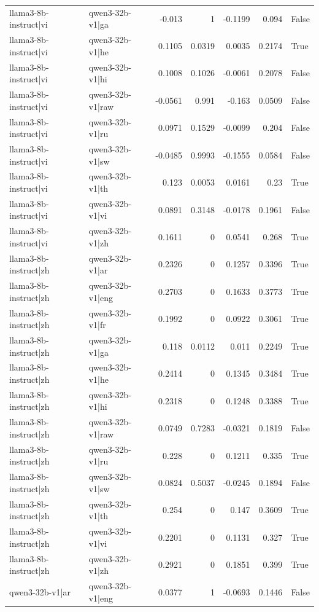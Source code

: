 \begin{table}
\begin{tabular}{l l r r r r l}
llama3-8b-instruct|vi & qwen3-32b-v1|ga & -0.013 & 1 & -0.1199 & 0.094 & False \\
llama3-8b-instruct|vi & qwen3-32b-v1|he & 0.1105 & 0.0319 & 0.0035 & 0.2174 & True \\
llama3-8b-instruct|vi & qwen3-32b-v1|hi & 0.1008 & 0.1026 & -0.0061 & 0.2078 & False \\
llama3-8b-instruct|vi & qwen3-32b-v1|raw & -0.0561 & 0.991 & -0.163 & 0.0509 & False \\
llama3-8b-instruct|vi & qwen3-32b-v1|ru & 0.0971 & 0.1529 & -0.0099 & 0.204 & False \\
llama3-8b-instruct|vi & qwen3-32b-v1|sw & -0.0485 & 0.9993 & -0.1555 & 0.0584 & False \\
llama3-8b-instruct|vi & qwen3-32b-v1|th & 0.123 & 0.0053 & 0.0161 & 0.23 & True \\
llama3-8b-instruct|vi & qwen3-32b-v1|vi & 0.0891 & 0.3148 & -0.0178 & 0.1961 & False \\
llama3-8b-instruct|vi & qwen3-32b-v1|zh & 0.1611 & 0 & 0.0541 & 0.268 & True \\
llama3-8b-instruct|zh & qwen3-32b-v1|ar & 0.2326 & 0 & 0.1257 & 0.3396 & True \\
llama3-8b-instruct|zh & qwen3-32b-v1|eng & 0.2703 & 0 & 0.1633 & 0.3773 & True \\
llama3-8b-instruct|zh & qwen3-32b-v1|fr & 0.1992 & 0 & 0.0922 & 0.3061 & True \\
llama3-8b-instruct|zh & qwen3-32b-v1|ga & 0.118 & 0.0112 & 0.011 & 0.2249 & True \\
llama3-8b-instruct|zh & qwen3-32b-v1|he & 0.2414 & 0 & 0.1345 & 0.3484 & True \\
llama3-8b-instruct|zh & qwen3-32b-v1|hi & 0.2318 & 0 & 0.1248 & 0.3388 & True \\
llama3-8b-instruct|zh & qwen3-32b-v1|raw & 0.0749 & 0.7283 & -0.0321 & 0.1819 & False \\
llama3-8b-instruct|zh & qwen3-32b-v1|ru & 0.228 & 0 & 0.1211 & 0.335 & True \\
llama3-8b-instruct|zh & qwen3-32b-v1|sw & 0.0824 & 0.5037 & -0.0245 & 0.1894 & False \\
llama3-8b-instruct|zh & qwen3-32b-v1|th & 0.254 & 0 & 0.147 & 0.3609 & True \\
llama3-8b-instruct|zh & qwen3-32b-v1|vi & 0.2201 & 0 & 0.1131 & 0.327 & True \\
llama3-8b-instruct|zh & qwen3-32b-v1|zh & 0.2921 & 0 & 0.1851 & 0.399 & True \\
qwen3-32b-v1|ar & qwen3-32b-v1|eng & 0.0377 & 1 & -0.0693 & 0.1446 & False \\

\end{tabular}
\end{table}
